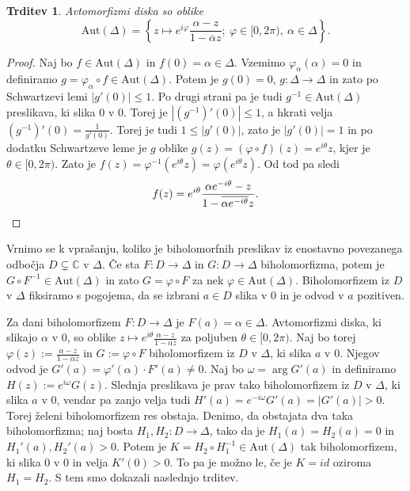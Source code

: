 \documentclass[10pt, a4paper]{article}
\newtheorem{trditev}[izr]{Trditev}
\newenvironment{noticeC}{%
  \tcolorbox[%
  notitle,
  empty,
  enhanced,  %
  breakable,
  coltext=black, 
  fontupper=\rmfamily,
  parbox=false,
  noparskip,
  sharp corners,
  boxrule=-1pt,  %
  frame hidden,
  left=7pt,  %
  right=7pt,
  top=5pt,
  bottom=5pt,
  before skip=2.5ex plus 2pt,
  after skip=2.5ex plus 2pt,
  overlay unbroken and last={%
  },
  ]}
{\endtcolorbox}
\newenvironment{dokaz}%
  {\begin{noticeC}\begin{proof}}%
  {\end{proof}\end{noticeC}}
\newcommand{\C}{\mathbb {C}}
\begin{document}
\begin{trditev}
  Avtomorfizmi diska so oblike 
  $$\mathrm{Aut} (\Delta) = \left\lbrace z \mapsto e^{i\varphi} \frac{\alpha - z}{1 - \overline{\alpha}z};\ \varphi \in [0, 2\pi),\ \alpha \in \Delta\right\rbrace.$$
\end{trditev}

\begin{dokaz}
  Naj bo $f \in \mathrm{Aut}(\Delta)$ in $f(0) = \alpha \in \Delta$.
  Vzemimo $\varphi_\alpha (\alpha) = 0$ in definiramo $g = \varphi_\alpha \circ f \in \mathrm{Aut}(\Delta)$.
  Potem je $g(0) = 0$, $g: \Delta \to \Delta$ in zato po Schwartzevi lemi $|g'(0)| \leq 1$.
  Po drugi strani pa je tudi $g^{-1} \in \mathrm{Aut} (\Delta)$ preslikava, ki slika $0$ v $0$.
  Torej je $|(g^{-1})'(0)| \leq 1$, a hkrati velja $(g^{-1})'(0) = \frac{1}{g'(0)}$.
  Torej je tudi $1 \leq |g'(0)|$, zato je $|g'(0)| = 1$ in po dodatku Schwartzeve leme
  je $g$ oblike $g(z) = (\varphi \circ f) (z) = e^{i\theta} z$, kjer je $\theta \in [0, 2\pi).$
  Zato je $f(z) = \varphi^{-1} (e^{i\theta} z) = \varphi (e^{i\theta} z)$.
  Od tod pa sledi 
  \begin{equation*}
    f(z) = e^{i\theta} \frac{\alpha e^{-i \theta} - z}{1 - \overline{\alpha e^{-i\theta}}z}. \qedhere 
  \end{equation*}
\end{dokaz}

Vrnimo se k vprašanju, koliko je biholomorfnih preslikav iz enostavno povezanega odbočja $D \subsetneq \C$
v $\Delta$. Če sta $F: D \to \Delta$ in $G: D \to \Delta$ biholomorfizma,
potem je $G \circ F^{-1} \in \mathrm{Aut} (\Delta)$ in zato $G = \varphi \circ F$
za nek $\varphi \in \mathrm{Aut} (\Delta).$ Biholomorfizem iz $D$ v $\Delta$
fiksiramo s pogojema, da se izbrani $a \in D$ slika v $0$ in je odvod v $a$ pozitiven.

Za dani biholomorfizem $F: D \to \Delta$ je $F(a) = \alpha \in \Delta$.
Avtomorfizmi diska, ki slikajo $\alpha$ v $0$, so oblike $z \mapsto e^{i \theta} \frac{\alpha - z}{1 - \overline{\alpha}z}$
za poljuben $\theta \in [0, 2\pi).$ 
Naj bo torej $\varphi (z) := \frac{\alpha - z}{1 - \overline{\alpha}z}$ in $G := \varphi \circ F$ biholomorfizem iz $D$ v $\Delta$,
ki slika $a$ v $0$. Njegov odvod je $G'(a) = \varphi'(\alpha) \cdot F'(a) \neq 0$.
Naj bo $\omega = \arg G'(a)$ in definiramo $H(z) := e^{i\omega} G(z)$.
Slednja preslikava je prav tako biholomorfizem iz $D$ v $\Delta$, ki slika $a$ v $0$,
vendar pa zanjo velja tudi $H'(a) = e^{-i \omega} G'(a) = |G'(a)| > 0$. Torej želeni biholomorfizem res obstaja.
Denimo, da obstajata dva taka biholomorfizma; naj bosta $H_1 , H_2 : D \to \Delta$,
tako da je $H_1 (a) = H_2 (a) = 0$ in $H_1'(a), H_2 '(a) > 0$.
Potem je $K = H_2 \circ H_1^{-1} \in \mathrm{Aut} (\Delta)$ tak biholomorfizem, ki slika 
$0$ v $0$ in velja $K'(0) > 0$. To pa je možno le, če je $K = id$ oziroma $H_1 = H_2$.
S tem smo dokazali naslednjo trditev.
\end{document}
